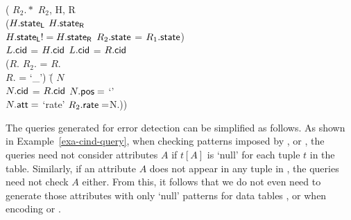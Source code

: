 \begin{example}
\begin{footnotesize}
{\> \>   ( $R_2.*$   $R_2$, \Enc{} H,  R\\
\>\>\>    ($H.\protect\mathsf{state_L}$  $H.\protect\mathsf{state_R}$  \\
\>\>\>\> $H.\protect\mathsf{state_L} != H.\protect\mathsf{state_R}$  $R_2.\protect\mathsf{state}$ = $R_1.\protect\mathsf{state}$)\\
\>\>\>\>  $L.\protect\mathsf{cid}$ = $H.\protect\mathsf{cid}$   $L.\protect\mathsf{cid}$ = $R.\protect\mathsf{cid}$ \\
\>\>\>\>($R.$   $R_2.$ = $R.$  \\
\>\>\>\> $R.$ = `\_')   (\= $N$ \\
\>\>\>\> $N.\protect\mathsf{cid}$ = $R.\protect\mathsf{cid}$  $N.\protect\mathsf{pos} =$ `\RHS'\\
\>\>\>\>   $N.\protect\mathsf{att} = $ `rate'  $R_2.\protect\mathsf{rate} = $N.)) }
\end{footnotesize}



The \SQL queries generated for error detection can be simplified as
follows. As shown in Example~\ref{exa-cind-query}, when checking
patterns imposed by \Enc{},  or , the queries need not
consider attributes $A$ if $t[A]$ is `null' for each tuple $t$ in
the table. Similarly, if an attribute $A$ does not appear in any
tuple in \Enc{\ne},  the queries need not check $A$ either. From
this, it follows that we do not even need to generate those
attributes with only `null' patterns for data tables \Enc{}, 
or  when encoding \pCINDs or \pCFDs.
\end{example}

